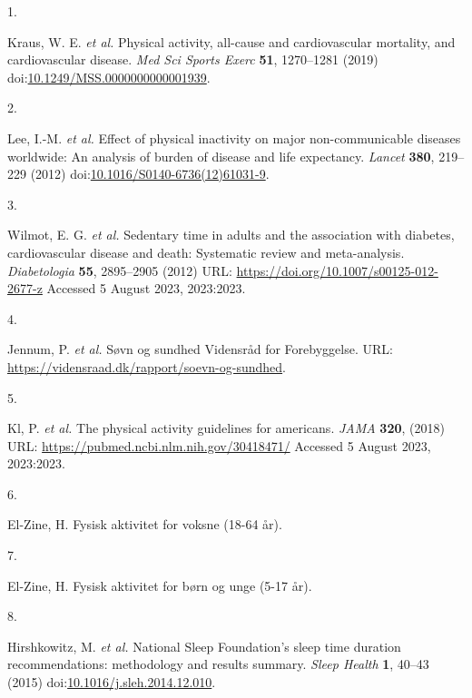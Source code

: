 \documentclass[
  10pt,
]{scrbook}
\newlength{\cslhangindent}
\newlength{\csllabelwidth}
\newlength{\cslentryspacingunit} %
\newenvironment{CSLReferences}[2] %
 {%
  \setlength{\parindent}{0pt}
  \ifodd #1
  \let\oldpar\par
  \def\par{\hangindent=\cslhangindent\oldpar}
  \fi
  \setlength{\parskip}{#2\cslentryspacingunit}
 }%
 {}
\newcommand{\CSLLeftMargin}[1]{\parbox[t]{\csllabelwidth}{#1}}
\newcommand{\CSLRightInline}[1]{\parbox[t]{\linewidth - \csllabelwidth}{#1}\break}
\begin{document}
\hypertarget{refs}{}
\begin{CSLReferences}{0}{0}
\leavevmode{}%
\CSLLeftMargin{1. }%
\CSLRightInline{Kraus, W. E. \emph{et al.} Physical activity, all-cause
and cardiovascular mortality, and cardiovascular disease. \emph{Med Sci
Sports Exerc} \textbf{51}, 1270--1281 (2019)
doi:\href{https://doi.org/10.1249/MSS.0000000000001939}{10.1249/MSS.0000000000001939}.}

\leavevmode{}%
\CSLLeftMargin{2. }%
\CSLRightInline{Lee, I.-M. \emph{et al.} Effect of physical inactivity
on major non-communicable diseases worldwide: An analysis of burden of
disease and life expectancy. \emph{Lancet} \textbf{380}, 219--229 (2012)
doi:\href{https://doi.org/10.1016/S0140-6736(12)61031-9}{10.1016/S0140-6736(12)61031-9}.}

\leavevmode{}%
\CSLLeftMargin{3. }%
\CSLRightInline{Wilmot, E. G. \emph{et al.} Sedentary time in adults and
the association with diabetes, cardiovascular disease and death:
Systematic review and meta-analysis. \emph{Diabetologia} \textbf{55},
2895--2905 (2012) URL: \url{https://doi.org/10.1007/s00125-012-2677-z}
Accessed 5 August 2023, 2023:2023.}

\leavevmode{}%
\CSLLeftMargin{4. }%
\CSLRightInline{Jennum, P. \emph{et al.} Søvn og sundhed \textbar{}
Vidensråd for Forebyggelse. URL:
\url{https://vidensraad.dk/rapport/soevn-og-sundhed}.}

\leavevmode{}%
\CSLLeftMargin{5. }%
\CSLRightInline{Kl, P. \emph{et al.} The physical activity guidelines
for americans. \emph{{JAMA}} \textbf{320}, (2018) URL:
\url{https://pubmed.ncbi.nlm.nih.gov/30418471/} Accessed 5 August 2023,
2023:2023.}

\leavevmode{}%
\CSLLeftMargin{6. }%
\CSLRightInline{El-Zine, H. Fysisk aktivitet for voksne (18-64 år).}

\leavevmode{}%
\CSLLeftMargin{7. }%
\CSLRightInline{El-Zine, H. Fysisk aktivitet for børn og unge (5-17
år).}

\leavevmode{}%
\CSLLeftMargin{8. }%
\CSLRightInline{Hirshkowitz, M. \emph{et al.} National Sleep
Foundation's sleep time duration recommendations: methodology and
results summary. \emph{Sleep Health} \textbf{1}, 40--43 (2015)
doi:\href{https://doi.org/10.1016/j.sleh.2014.12.010}{10.1016/j.sleh.2014.12.010}.}


\end{CSLReferences}
\end{document}
